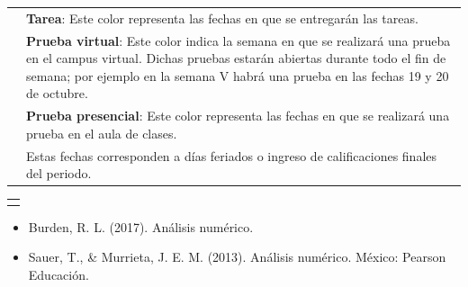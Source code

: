 \documentclass[11.9pt,letterpaper]{article}
\begin{document}
\begin{multicols}{2}
\begin{center}
\begin{tabular}{lp{}}
\cellcolor{TAREA}{\ }&\textbf{Tarea}: Este color representa las fechas en que se entregarán las tareas.\\
\cellcolor{VIRTUAL}{\ }&\textbf{Prueba virtual}: Este color indica la semana en que se realizará una prueba en el campus virtual. Dichas pruebas estarán abiertas durante todo el fin de semana; por ejemplo en la semana V habrá una prueba en las fechas 19 y 20 de octubre. \\
\cellcolor{EXAMEN}{\ }&\textbf{Prueba presencial}: Este color representa las fechas en que se realizará una prueba en el aula de clases.\\
\cellcolor{gray!40}{\ }&Estas fechas corresponden a días feriados o ingreso de calificaciones finales del periodo.
\end{tabular}
\end{center}
\begin{center}
\begin{tabular}{c}
\cellcolor{gray!40}{BIBLIOGRAFÍAS}
\end{tabular}
\end{center}
\begin{itemize}
\item Burden, R. L. (2017). Análisis numérico.
\item Sauer, T., \& Murrieta, J. E. M. (2013). Análisis numérico. México: Pearson Educación.
\end{itemize}
\end{multicols}
\begin{center}
\end{center}
\end{document}
